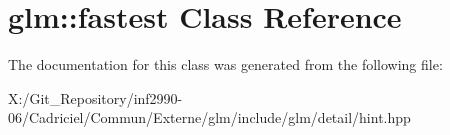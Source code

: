 \hypertarget{classglm_1_1fastest}{\section{glm\-:\-:fastest Class Reference}
\label{classglm_1_1fastest}
}


The documentation for this class was generated from the following file\-:\begin{DoxyCompactItemize}
\item 
X\-:/\-Git\-\_\-\-Repository/inf2990-\/06/\-Cadriciel/\-Commun/\-Externe/glm/include/glm/detail/hint.\-hpp\end{DoxyCompactItemize}
